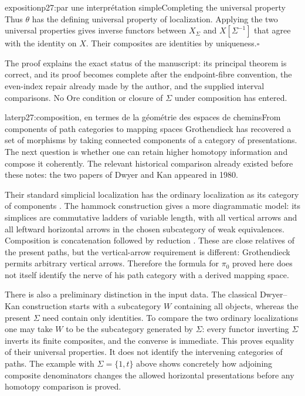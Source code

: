 \begin{dcomment}{exposition}{p27:par une interprétation simple}{Completing the universal property}
Thus $\theta$ has the defining universal property of localization. Applying the two universal properties gives inverse functors between $X_\Sigma$ and $X[\Sigma^{-1}]$ that agree with the identity on $X$. Their composites are identities by uniqueness.\hfill$\square$

The proof explains the exact status of the manuscript: its principal theorem is correct, and its proof becomes complete after the endpoint-fibre convention, the even-index repair already made by the author, and the supplied interval comparisons. No Ore condition or closure of $\Sigma$ under composition has entered.
\end{dcomment}


\begin{dcomment}{later}{p27:composition, en termes de la géométrie des espaces de chemins}{From components of path categories to mapping spaces}
Grothendieck has recovered a set of morphisms by taking connected components of a category of presentations. The next question is whether one can retain higher homotopy information and compose it coherently. The relevant historical comparison already existed before these notes: the two papers of Dwyer and Kan appeared in 1980.

Their standard simplicial localization has the ordinary localization as its category of components \citep[\S4.2]{DwyerKan1980Simplicial}. The hammock construction gives a more diagrammatic model: its simplices are commutative ladders of variable length, with all vertical arrows and all leftward horizontal arrows in the chosen subcategory of weak equivalences. Composition is concatenation followed by reduction \citep[Definition~2.1 and Proposition~3.1]{DwyerKan1980Calculating}. These are close relatives of the present paths, but the vertical-arrow requirement is different: Grothendieck permits arbitrary vertical arrows. Therefore the formula for $\pi_0$ proved here does not itself identify the nerve of his path category with a derived mapping space.

There is also a preliminary distinction in the input data. The classical Dwyer--Kan construction starts with a subcategory $W$ containing all objects, whereas the present $\Sigma$ need contain only identities. To compare the two ordinary localizations one may take $W$ to be the subcategory generated by $\Sigma$: every functor inverting $\Sigma$ inverts its finite composites, and the converse is immediate. This proves equality of their universal properties. It does not identify the intervening categories of paths. The example with $\Sigma=\{1,t\}$ above shows concretely how adjoining composite denominators changes the allowed horizontal presentations before any homotopy comparison is proved.


\end{dcomment}

